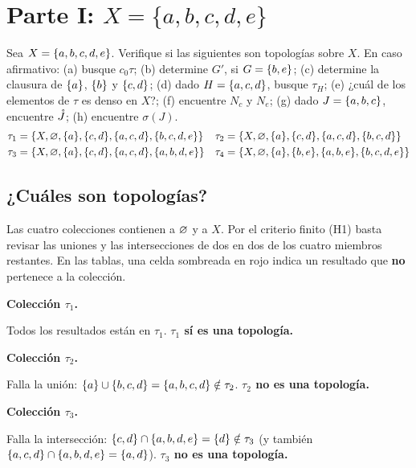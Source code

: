 \section{Parte I: \texorpdfstring{$X=\{a,b,c,d,e\}$}{X = \{a,b,c,d,e\}}}
\begin{enunciado}
Sea $X=\{a,b,c,d,e\}$. Verifique si las siguientes son topologías sobre $X$. En caso afirmativo:
(a) busque $c_0\tau$; (b) determine $G'$, si $G=\{b,e\}$; (c) determine la clausura de $\{a\}$, $\{b\}$ y $\{c,d\}$;
(d) dado $H=\{a,c,d\}$, busque $\tau_H$; (e) ¿cuál de los elementos de $\tau$ es denso en $X$?; (f) encuentre $N_c$ y
$N_e$; (g) dado $J=\{a,b,c\}$, encuentre $\mathring{J}$; (h) encuentre $\sigma(J)$.
\begin{align*}
\tau_1&=\{X,\varnothing,\{a\},\{c,d\},\{a,c,d\},\{b,c,d,e\}\} & \tau_2&=\{X,\varnothing,\{a\},\{c,d\},\{a,c,d\},\{b,c,d\}\}\\
\tau_3&=\{X,\varnothing,\{a\},\{c,d\},\{a,c,d\},\{a,b,d,e\}\} & \tau_4&=\{X,\varnothing,\{a\},\{b,e\},\{a,b,e\},\{b,c,d,e\}\}
\end{align*}
\end{enunciado}

\subsection{¿Cuáles son topologías?}
Las cuatro colecciones contienen a $\varnothing$ y a $X$. Por el criterio finito (H1) basta revisar las uniones y las
intersecciones de dos en dos de los cuatro miembros restantes. En las tablas, una celda sombreada en rojo indica un
resultado que \textbf{no} pertenece a la colección.

\newcommand{\dostablas}[2]{{\small\renewcommand{\arraystretch}{1.15}\qquad}}

\textbf{Colección $\tau_1$.}
\begin{center}\dostablas{tab_I1_u}{tab_I1_i}\end{center}
Todos los resultados están en $\tau_1$. \textbf{$\tau_1$ sí es una topología.}

\textbf{Colección $\tau_2$.}
\begin{center}\dostablas{tab_I2_u}{tab_I2_i}\end{center}
Falla la unión: $\{a\}\cup\{b,c,d\}=\{a,b,c,d\}\notin\tau_2$. \textbf{$\tau_2$ no es una topología.}

\textbf{Colección $\tau_3$.}
\begin{center}\dostablas{tab_I3_u}{tab_I3_i}\end{center}
Falla la intersección: $\{c,d\}\cap\{a,b,d,e\}=\{d\}\notin\tau_3$ (y también $\{a,c,d\}\cap\{a,b,d,e\}=\{a,d\}$).
\textbf{$\tau_3$ no es una topología.}

